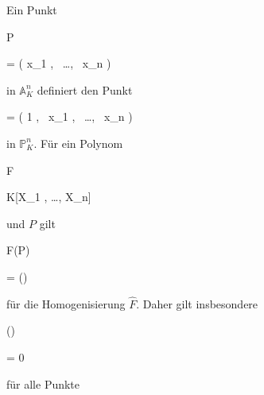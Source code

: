 {


Ein Punkt


\mavergleichskette

{\vergleichskette

{P
}

{ = }{ \left(  x_1   , \,   \ldots  , \,   x_n                 \right)
}

{  }{
}

{    }{
}

{   }{
}

}
{}{}{}
in ${ {\mathbb A}_{  K }^{  n   } }$ definiert den Punkt


\mavergleichskette

{\vergleichskette

{ 
}

{ = }{ \left(  1   , \,   x_1  , \,   \ldots , \,   x_n                \right)
}

{  }{
}

{    }{
}

{   }{
}

}
{}{}{}
in ${\mathbb P}^{ n }_{ K}$. Für ein Polynom


\mavergleichskette

{\vergleichskette

{ F
}

{ \in }{ K[X_1 , \ldots , X_n]
}

{  }{
}

{    }{
}

{   }{
}

}
{}{}{}
und $P$ gilt


\mavergleichskette

{\vergleichskette

{ F(P)
}

{ = }{  ()
}

{  }{
}

{    }{
}

{   }{
}

}
{}{}{}
für die Homogenisierung $\hat{  F   }$. Daher gilt insbesondere


\mavergleichskette

{\vergleichskette

{  ()
}

{ = }{ 0
}

{  }{
}

{    }{
}

{   }{
}

}
{}{}{}
für alle Punkte


\mavergleichskette

}
